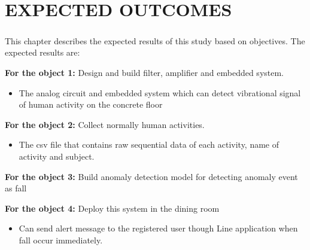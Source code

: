 \setlength{\parindent}{0in} 
\setlength{\parskip}{1em}
\setlength{\baselineskip}{1.6em}

\chapter{EXPECTED OUTCOMES}
\label{ch:results}
\paragraph{}
This chapter describes the expected results of this study based on objectives. The expected results are: 

\textbf{For the object 1:} Design and build filter, amplifier and embedded system.
\begin{itemize}
\item The analog circuit and embedded system which can detect vibrational signal of human activity on the concrete floor
\end{itemize}


\textbf{For the object 2:}  Collect normally human activities.
\begin{itemize}
\item The csv file that contains raw sequential data of each activity, name of activity and subject.
\end{itemize}


\textbf{For the object 3:} Build anomaly detection model for detecting anomaly event as fall


\textbf{For the object 4:} Deploy this system in the dining room
\begin{itemize}
\item Can send alert message to the registered user though Line application when fall occur immediately.
\end{itemize}

\FloatBarrier